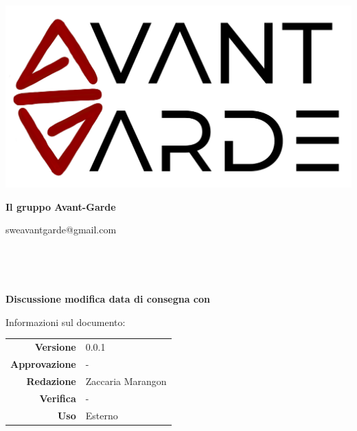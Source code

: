     \begin{titlepage}
        \begin{center}
            \includegraphics[width=\textwidth]{logo+scritta.png}

            \vspace{0.5cm}
            {\huge \textbf{Il gruppo Avant-Garde}}

            \vspace{0.4cm}
            \large{sweavantgarde@gmail.com}

            \vspace{1.5cm}
            \hrulefill\\
            \vspace{0.2cm}
            
            \textbf{\titoloDocumento}\\
            \vspace{0.5cm}

            \textbf{Discussione modifica data di consegna con \textcolor{red}{\nomeAzienda}}\\
            \hrulefill

            \vfill
            Informazioni sul documento:\\
            \vspace{0.3cm}
                \begin{tabular}{ r | l }
                    \textbf{Versione} & 0.0.1\\ %
                    \textbf{Approvazione} & -\\ %
                    \textbf{Redazione} & Zaccaria Marangon\\ %
                    \textbf{Verifica} & -\\ %
                    \textbf{Uso} & Esterno\\ %
                \end{tabular}
        \end{center}
    \end{titlepage}
\restoregeometry